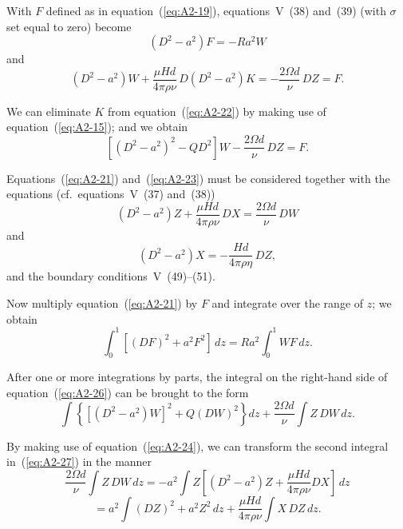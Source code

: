 With $F$ defined as in equation~(\ref{eq:A2-19}), equations~V~(38) and~(39) (with $\sigma$ set equal to zero) become
\begin{equation}
\label{eq:A2-21}
(D^2 - a^2)F = -Ra^2 W
\end{equation}
and
\begin{equation}
\label{eq:A2-22}
(D^2 - a^2)W + \frac{\mu Hd}{4\pi\rho\nu}\, D(D^2 - a^2)K = -\frac{2\Omega d}{\nu}\, DZ = F.
\end{equation}

We can eliminate $K$ from equation~(\ref{eq:A2-22}) by making use of equation~(\ref{eq:A2-15}); and we obtain
\begin{equation}
\label{eq:A2-23}
[(D^2 - a^2)^2 - QD^2]W - \frac{2\Omega d}{\nu}\, DZ = F.
\end{equation}

Equations~(\ref{eq:A2-21}) and~(\ref{eq:A2-23}) must be considered together with the equations (cf.\ equations~V~(37) and~(38))
\begin{equation}
\label{eq:A2-24}
(D^2 - a^2)Z + \frac{\mu Hd}{4\pi\rho\nu}\, DX = \frac{2\Omega d}{\nu}\, DW
\end{equation}
and
\begin{equation}
\label{eq:A2-25}
(D^2 - a^2)X = -\frac{Hd}{4\pi\rho\eta}\, DZ,
\end{equation}
and the boundary conditions~V~(49)--(51).

Now multiply equation~(\ref{eq:A2-21}) by $F$ and integrate over the range of $z$; we obtain
\begin{equation}
\label{eq:A2-26}
\int_0^1 [(DF)^2 + a^2 F^2] \, dz = Ra^2 \int_0^1 WF \, dz.
\end{equation}

After one or more integrations by parts, the integral on the right-hand side of equation~(\ref{eq:A2-26}) can be brought to the form
\begin{equation}
\label{eq:A2-27}
\int \left\{ [(D^2 - a^2)W]^2 + Q(DW)^2 \right\} dz + \frac{2\Omega d}{\nu} \int Z\, DW \, dz.
\end{equation}

By making use of equation~(\ref{eq:A2-24}), we can transform the second integral in~(\ref{eq:A2-27}) in the manner
\begin{equation}
\label{eq:A2-28}
\frac{2\Omega d}{\nu} \int Z\, DW \, dz = -a^2 \int Z[(D^2 - a^2)Z + \frac{\mu Hd}{4\pi\rho\nu} DX] \, dz
\end{equation}
\[
= a^2 \int (DZ)^2 + a^2 Z^2 \, dz + \frac{\mu Hd}{4\pi\rho\nu} \int X\, DZ \, dz.
\]


